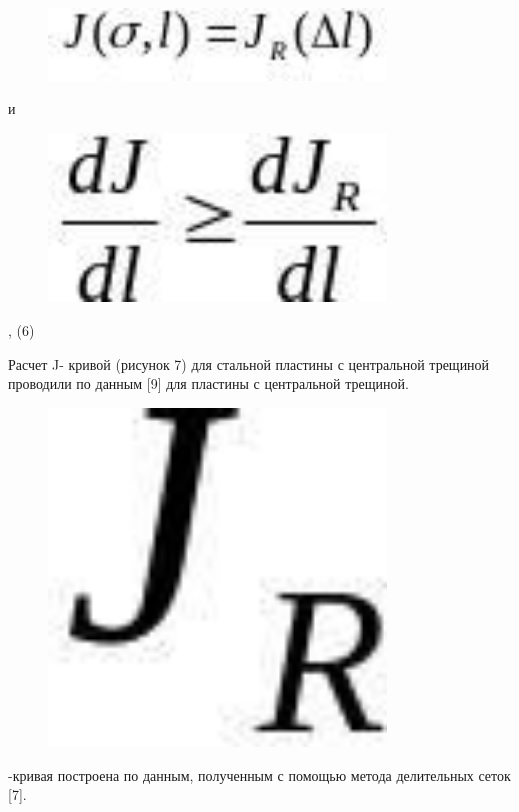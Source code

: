 \begin{figure}[H]
	\centering
	\includegraphics[width=0.8\textwidth]{assets/1201}
	\caption*{}
\end{figure} и
\begin{figure}[H]
	\centering
	\includegraphics[width=0.8\textwidth]{assets/1202}
	\caption*{}
\end{figure}, (6)

Расчет J- кривой (рисунок 7) для стальной пластины с центральной
трещиной проводили по данным {[}9{]} для пластины с центральной
трещиной. \begin{figure}[H]
	\centering
	\includegraphics[width=0.8\textwidth]{assets/1203}
	\caption*{}
\end{figure}-кривая построена по
данным, полученным с помощью метода делительных сеток {[}7{]}.

